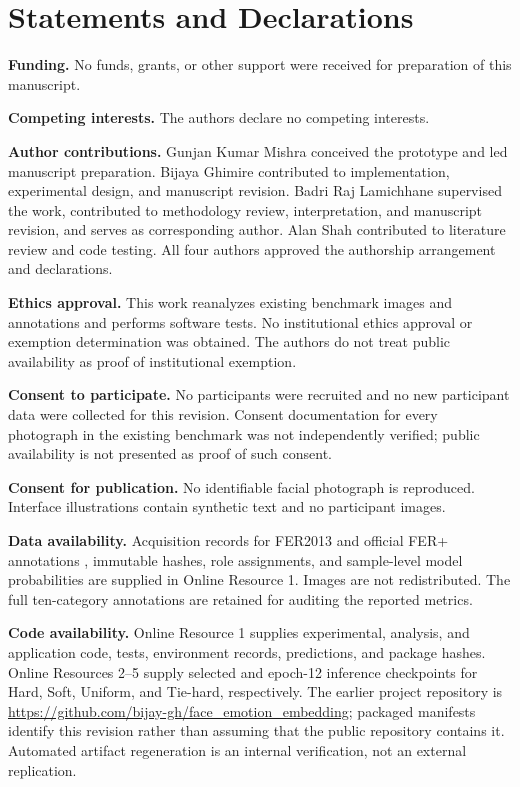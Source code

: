 \documentclass[pdflatex,sn-mathphys-num]{sn-jnl}
\begin{document}
\backmatter
\section*{Statements and Declarations}
\noindent\textbf{Funding.} No funds, grants, or other support were received for preparation of this manuscript.

\noindent\textbf{Competing interests.} The authors declare no competing interests.

\noindent\textbf{Author contributions.} Gunjan Kumar Mishra conceived the prototype and led manuscript preparation. Bijaya Ghimire contributed to implementation, experimental design, and manuscript revision. Badri Raj Lamichhane supervised the work, contributed to methodology review, interpretation, and manuscript revision, and serves as corresponding author. Alan Shah contributed to literature review and code testing. All four authors approved the authorship arrangement and declarations.

\noindent\textbf{Ethics approval.} This work reanalyzes existing benchmark images and annotations and performs software tests. No institutional ethics approval or exemption determination was obtained. The authors do not treat public availability as proof of institutional exemption.

\noindent\textbf{Consent to participate.} No participants were recruited and no new participant data were collected for this revision. Consent documentation for every photograph in the existing benchmark was not independently verified; public availability is not presented as proof of such consent.

\noindent\textbf{Consent for publication.} No identifiable facial photograph is reproduced. Interface illustrations contain synthetic text and no participant images.

\noindent\textbf{Data availability.} Acquisition records for FER2013 \cite{goodfellow2013fer} and official FER+ annotations \cite{barsoum2016ferplus}, immutable hashes, role assignments, and sample-level model probabilities are supplied in Online Resource 1. Images are not redistributed. The full ten-category annotations are retained for auditing the reported metrics.

\noindent\textbf{Code availability.} Online Resource 1 supplies experimental, analysis, and application code, tests, environment records, predictions, and package hashes. Online Resources 2--5 supply selected and epoch-12 inference checkpoints for Hard, Soft, Uniform, and Tie-hard, respectively. The earlier project repository is \url{https://github.com/bijay-gh/face_emotion_embedding}; packaged manifests identify this revision rather than assuming that the public repository contains it. Automated artifact regeneration is an internal verification, not an external replication.
\end{document}
